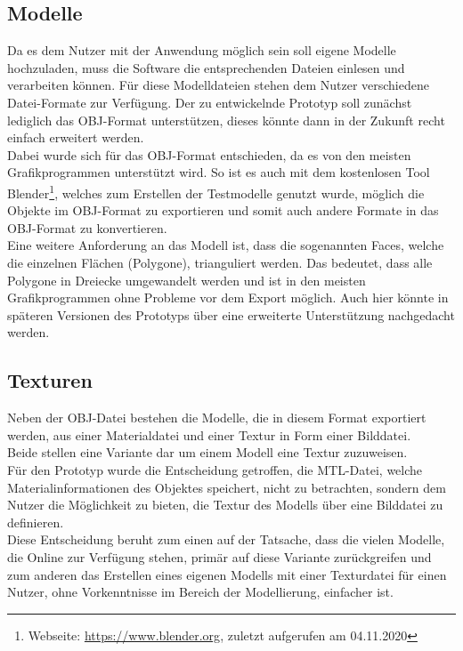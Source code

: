 \subsection{Modelle}
Da es dem Nutzer mit der Anwendung möglich sein soll eigene Modelle hochzuladen, muss die Software die entsprechenden Dateien einlesen und verarbeiten können. Für diese Modelldateien stehen dem Nutzer verschiedene Datei-Formate zur Verfügung. Der zu entwickelnde Prototyp soll zunächst lediglich das OBJ-Format unterstützen, dieses könnte dann in der Zukunft recht einfach erweitert werden. \\
Dabei wurde sich für das OBJ-Format entschieden, da es von den meisten Grafikprogrammen unterstützt wird. So ist es auch mit dem kostenlosen Tool Blender\footnote{Webseite: \url{https://www.blender.org}, zuletzt aufgerufen am 04.11.2020}, welches zum Erstellen der Testmodelle genutzt wurde, möglich die Objekte im OBJ-Format zu exportieren und somit auch andere Formate in das OBJ-Format zu konvertieren. \\
Eine weitere Anforderung an das Modell ist, dass die sogenannten Faces, welche die einzelnen Flächen (Polygone), trianguliert werden. Das bedeutet, dass alle Polygone in Dreiecke umgewandelt werden und ist in den meisten Grafikprogrammen ohne Probleme vor dem Export möglich. Auch hier könnte in späteren Versionen des Prototyps über eine erweiterte Unterstützung nachgedacht werden.

\subsection{Texturen}
Neben der OBJ-Datei bestehen die Modelle, die in diesem Format exportiert werden, aus einer Materialdatei und einer Textur in Form einer Bilddatei.\\
Beide stellen eine Variante dar um einem Modell eine Textur zuzuweisen.\\
Für den Prototyp wurde die Entscheidung getroffen, die MTL-Datei, welche Materialinformationen des Objektes speichert, nicht zu betrachten, sondern dem Nutzer die Möglichkeit zu bieten, die Textur des Modells über eine Bilddatei zu definieren.\\
Diese Entscheidung beruht zum einen auf der Tatsache, dass die vielen Modelle, die Online zur Verfügung stehen, primär auf diese Variante zurückgreifen und zum anderen das Erstellen eines eigenen Modells mit einer Texturdatei für einen Nutzer, ohne Vorkenntnisse im Bereich der Modellierung, einfacher ist.


